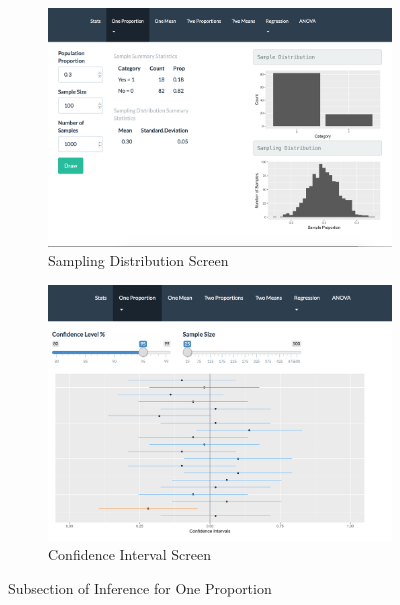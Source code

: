 \documentclass[11pt]{book}
\begin{document}
\begin{figure}
        \centering

        \begin{subfigure}[b]{0.75\textwidth}
                \includegraphics[width=\textwidth]{OneProp.png}
                \caption{Sampling Distribution Screen }
                \label{fig:OneProp}
        \end{subfigure}%

        \begin{subfigure}[b]{0.75\textwidth}
                \includegraphics[width=\textwidth]{OnePropCI.png}
                \caption{Confidence Interval Screen} 
                \label{fig:OnePropCI}
        \end{subfigure}

\caption {Subsection of Inference for One Proportion}
\end{figure}
\end{document}
